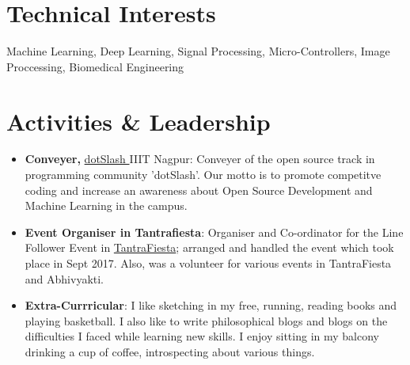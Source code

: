 \documentclass[a4paper,10pt]{extarticle} %
\begin{document}

\vspace{-0.3cm}
\section{\textcolor{primary}{Technical Interests}}

\noindent Machine Learning, Deep Learning, Signal Processing, Micro-Controllers, Image Proccessing, Biomedical Engineering \\


\vspace{-0.3cm}
\section{\textcolor{primary}{Activities \& Leadership}}

\begin{itemize}[leftmargin=0.55cm, rightmargin=0.2cm, label={\Large\textbullet}]
\item \textbf{Conveyer, }\href{https://google.com/}{ dotSlash  }IIIT Nagpur: Conveyer of the open source track in programming community 'dotSlash'. Our motto is to promote competitve coding and increase an awareness about Open Source Development and Machine Learning in the campus.
\item \textbf{Event Organiser in Tantrafiesta}: Organiser and Co-ordinator for the Line Follower Event in \href{https://google.com}{TantraFiesta}; arranged and handled the event which took place in Sept 2017. Also, was a volunteer for various events in TantraFiesta and Abhivyakti.
\item \textbf{Extra-Currricular}: I like sketching in my free, running, reading books and playing basketball. I also like to write philosophical blogs and blogs on the difficulties I faced while learning new skills. I enjoy sitting in my balcony drinking a cup of coffee, introspecting about various things.
\\
\end{itemize}








\end{document}
